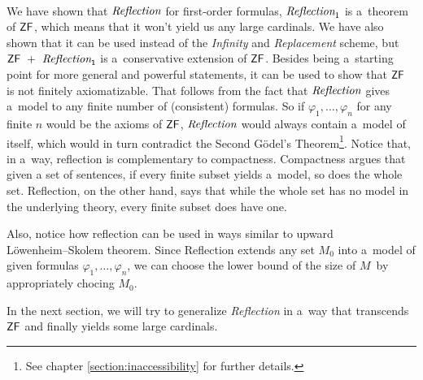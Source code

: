 \

We have shown that $\emph{Reflection}$ for first-order formulas, $\emph{Reflection}_1$ is a~theorem of $\sf{ZF}$, which means that it won't yield us any large cardinals. We have also shown that it can be used instead of the \emph{Infinity} and \emph{Replacement} scheme, but $\sf{ZF}\ +\ \emph{Reflection}_1$ is a~conservative extension of $\sf{ZF}$. Besides being a~starting point for more general and powerful statements, it can be used to show that $\sf{ZF}$ is not finitely axiomatizable. That follows from the fact that $\emph{Reflection}$ gives a~model to any finite number of (consistent) formulas. So if $\varphi_1, \ldots, \varphi_n$ for any finite $n$ would be the axioms of $\sf{ZF}$, $\emph{Reflection}$ would always contain a~model of itself, which would in turn contradict the Second Gödel's Theorem\footnote{See chapter \ref{section:inaccessibility} for further details.}.
Notice that, in a~way, reflection is complementary to compactness. Compactness argues that given a set of sentences, if every finite subset yields a~model, so does the whole set. Reflection, on the other hand, says that while the whole set has no model in the underlying theory, every finite subset does have one.

Also, notice how reflection can be used in ways similar to upward\\
Löwenheim–Skolem theorem. Since Reflection extends any set $M_0$ into a~model of given formulas $\varphi_1, \ldots, \varphi_n$, we can choose the lower bound of the size of $M$ by appropriately chocing $M_0$.

In the next section, we will try to generalize \emph{Reflection} in a~way that transcends $\sf{ZF}$ and finally yields some large cardinals.
\newpage
